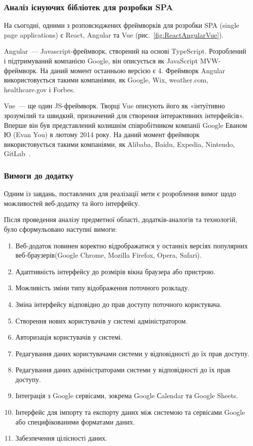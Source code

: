 \subsubsection{Аналіз існуючих бібліотек для розробки SPA}

На сьогодні, одними з розповсюджених фреймворків для розробки SPA (single page applications) є React, Angular та Vue (рис.~\ref{fig:ReactAngularVue}).


Angular~--- Javascript-фреймворк, створений на основі TypeScript. Розроблений і підтримуваний компанією Google, він описується як JavaScript MVW-фреймворк. На даний момент останньою версією є 4. Фреймворк Angular використовується такими компаніями, як Google, Wix, weather.com, healthcare.gov і Forbes.

\label{subs:vue}
Vue~--- ще один JS-фреймворк. Творці Vue описують його як «інтуїтивно зрозумілий та швидкий, призначений для створення інтерактивних інтерфейсів». Вперше він був представлений колишнім співробітником компанії Google Еваном Ю (Evan You) в лютому 2014 року. На даний момент фреймворк використовується такими компаніями, як Alibaba, Baidu, Expedia, Nintendo, GitLab~\cite{emmitscott2015}.

\subsubsection{Вимоги до додатку}

Одним із завдань, поставлених для реалізації мети є розроблення вимог щодо можливостей веб-додатку та його інтерфейсу.

Після проведення аналізу предметної області, додатків-аналогів та технологій, було сформульовано наступні вимоги:

\begin{enumerate}
    \item Веб-додаток повинен коректно відрображатися у останніх версіях популярних веб-браузерів(Google Chrome, Mozilla Firefox, Opera, Safari).
    \item Адаптивність інтерфейсу до розмірів вікна браузера або пристрою.
    \item Можливість зміни типу відображення поточного розкладу.
    \item Зміна інтерфейсу відповідно до прав доступу поточного користувача.
    \item Створення нових користувачів у системі адміністратором.
    \item Авторизація користувачів у системі.
    \item Редагування даних користувачами системи у відповідності до їх прав доступу.
    \item Редагування даних адміністраторами системи у відповідності до їх прав доступу.
    \item Інтеграція з Google сервісами, зокрема Google Сalendar та Google Sheets.
    \item Інтерфейс для імпорту та експорту даних між системою та сервісами Google або специфікованими форматами даних.
    \item Забезпечення цілісності даних.
\end{enumerate}


